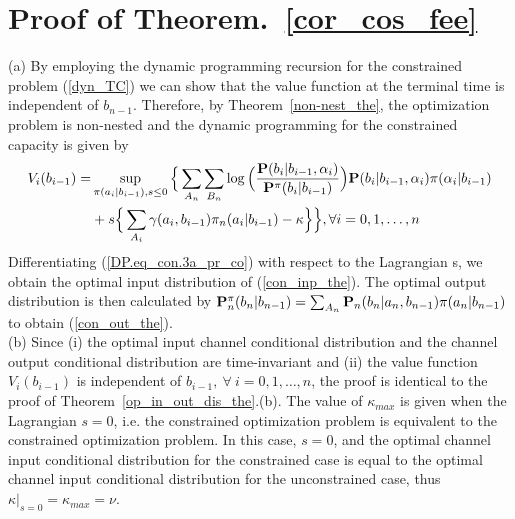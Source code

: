 \documentclass[11pt, a4paper, journal,onecolumn]{IEEEtran}
\newcommand{\sr}{\stackrel}
\newcommand{\rar}{\rightarrow}
\newcommand{\tri}{\sr{\triangle}{=}}
\newcommand{\bea}{\begin{eqnarray}}
\newcommand{\eea}{\end{eqnarray}}
\begin{document}


\section{Proof of Theorem.~\ref{cor_cos_fee}}\label{cor_cos_fee_proof}


(a)  By employing the dynamic programming recursion for the constrained problem (\ref{dyn_TC})
we can show that the value function at the terminal time is independent of $b_{n-1}$. Therefore, by Theorem~\ref{non-nest_the}, the optimization problem is non-nested and the dynamic programming for the constrained capacity is given by 
\begin{align}
V_i(b_{i-1})=&\sup_{\pi(a_i|b_{i-1}),s\leq 0}\Big\{\sum_{A_n}\sum_{B_n}\log\Big(\frac{{\bf P}(b_i|b_{i-1},\alpha_i)}{{\bf P}^\pi(b_i|b_{i-1})}\Big){\bf P}(b_i|b_{i-1},\alpha_i)\pi(\alpha_i|b_{i-1})\nonumber\\
&+s\Big\{\sum_{A_i}\gamma(a_i,b_{i-1})\pi_n(a_i|b_{i-1})-\kappa\Big\}\Big\}, \forall i=0,1,\ldots,n\label{DP.eq_con.3a_pr_co}
\end{align}
Differentiating (\ref{DP.eq_con.3a_pr_co}) with respect to the Lagrangian s, we obtain the optimal input distribution of (\ref{con_inp_the}). The optimal output distribution is then calculated by ${{\bf P}^{\pi}_{n}(b_{n}|b_{n-1})}=\sum_{A_n}{\bf P}_n(b_n|a_n,b_{n-1})\pi(a_{n}|b_{n{-}1})$
to obtain (\ref{con_out_the}).\\
(b) Since (i) the optimal input channel conditional distribution and the channel output conditional distribution are time-invariant and (ii) the value function $V_i(b_{i-1})$ is independent of $b_{i-1}, \ \forall \ i=0,1,\ldots,n$, the proof  is identical to the proof of Theorem~\ref{op_in_out_dis_the}.(b). The value of $\kappa_{max}$ is given when the Lagrangian $s=0$, i.e. the constrained optimization problem is equivalent to the constrained optimization problem. In this case, $s=0$, and the optimal channel input conditional distribution for the constrained case is equal to the optimal channel input conditional distribution for the unconstrained case, thus $\kappa|_{s=0}=\kappa_{max}=\nu$.






\end{document}
